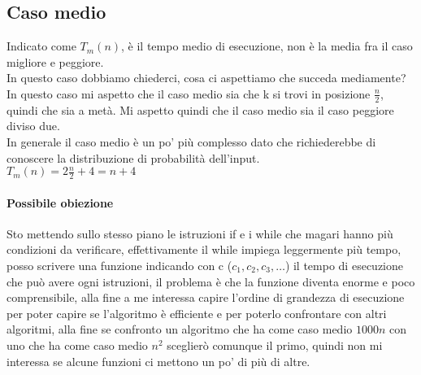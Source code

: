 \subsection{Caso medio}
Indicato come \textbf{$T_m(n)$}, è il tempo medio di esecuzione, non è la media fra il caso migliore e peggiore.\\
In questo caso dobbiamo chiederci, cosa ci aspettiamo che succeda mediamente?\\ In questo caso
mi aspetto che il caso medio sia che k si trovi in posizione $\frac{n}{2}$, quindi che sia a metà. Mi
aspetto quindi che il caso medio sia il caso peggiore diviso due.\\
In generale il caso medio è un po' più complesso dato che richiederebbe di conoscere la distribuzione
di probabilità dell'input.\\
$T_m(n)=2\frac{n}{2}+4=n+4$\\
\paragraph*{Possibile obiezione} Sto mettendo sullo stesso piano le istruzioni if e i while
che magari hanno più condizioni da verificare, effettivamente il while impiega leggermente
più tempo, posso scrivere una funzione indicando con c ($c_1, c_2, c_3, \dots$) il tempo di
esecuzione che può avere ogni istruzioni, il problema è che la funzione diventa enorme e poco
comprensibile, alla fine a me interessa capire l'ordine di grandezza di esecuzione per poter
capire se l'algoritmo è efficiente e per poterlo confrontare con altri algoritmi, alla fine
se confronto un algoritmo che ha come caso medio $1000n$ con uno che ha come caso medio $n^2$
sceglierò comunque il primo, quindi non mi interessa se alcune funzioni ci mettono un po' di più di
altre.
